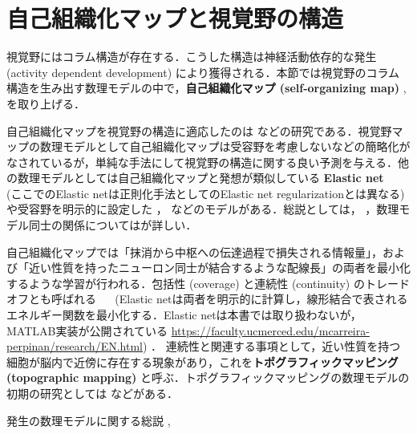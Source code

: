 \section{自己組織化マップと視覚野の構造}
視覚野にはコラム構造が存在する．こうした構造は神経活動依存的な発生  (activity dependent development) により獲得される．本節では視覚野のコラム構造を生み出す数理モデルの中で，\textbf{自己組織化マップ (self-organizing map)} \cite{Kohonen1982-mn}, \cite{Kohonen2013-yt}を取り上げる．

自己組織化マップを視覚野の構造に適応したのは\cite{Obermayer1990-gq} \cite{N_V_Swindale1998-ri}などの研究である．視覚野マップの数理モデルとして自己組織化マップは受容野を考慮しないなどの簡略化がなされているが，単純な手法にして視覚野の構造に関する良い予測を与える．他の数理モデルとしては自己組織化マップと発想が類似している \textbf{Elastic net}  \cite{Durbin1987-bp} \cite{Durbin1990-xx} \cite{Carreira-Perpinan2005-gy}　(ここでのElastic netは正則化手法としてのElastic net regularizationとは異なる)や受容野を明示的に設定した \cite{Tanaka2004-vz}， \cite{Ringach2007-oe}などのモデルがある．総説としては\cite{Das2005-mq}，\cite{Goodhill2007-va} ，数理モデル同士の関係については\cite{2002-nm}が詳しい．

自己組織化マップでは「抹消から中枢への伝達過程で損失される情報量」，および「近い性質を持ったニューロン同士が結合するような配線長」の両者を最小化するような学習が行われる．包括性 (coverage) と連続性 (continuity) のトレードオフとも呼ばれる \cite{Carreira-Perpinan2005-gy}　 (Elastic netは両者を明示的に計算し，線形結合で表されるエネルギー関数を最小化する．Elastic netは本書では取り扱わないが，MATLAB実装が公開されている
\url{https://faculty.ucmerced.edu/mcarreira-perpinan/research/EN.html}) ． 連続性と関連する事項として，近い性質を持つ細胞が脳内で近傍に存在する現象があり，これを\textbf{トポグラフィックマッピング (topographic mapping)} と呼ぶ．トポグラフィックマッピングの数理モデルの初期の研究としては\cite{Von_der_Malsburg1973-bz} \cite{Willshaw1976-zo} \cite{Takeuchi1979-mi}などがある．

発生の数理モデルに関する総説 \cite{Van_Ooyen2011-fz}, \cite{Goodhill2018-ho}
